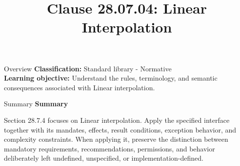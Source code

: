 \documentclass[10pt,letterpaper]{article}
\title{Clause 28.07.04: Linear Interpolation}
\author{}
\date{}
\begin{document}
\maketitle
\begin{CornellOverviewBox}{Overview}
\textbf{Classification:} Standard library - Normative\\[2pt]
\textbf{Learning objective:} Understand the rules, terminology, and semantic consequences associated with Linear interpolation.
\end{CornellOverviewBox}\begin{CornellSummaryBox}{Summary}
{\sffamily\bfseries\color{Accent} Summary}\par\vspace{3pt}Section 28.7.4 focuses on Linear interpolation. Apply the specified interface together with its mandates, effects, result conditions, exception behavior, and complexity constraints. When applying it, preserve the distinction between mandatory requirements, recommendations, permissions, and behavior deliberately left undefined, unspecified, or implementation-defined.
\end{CornellSummaryBox}
\end{document}

